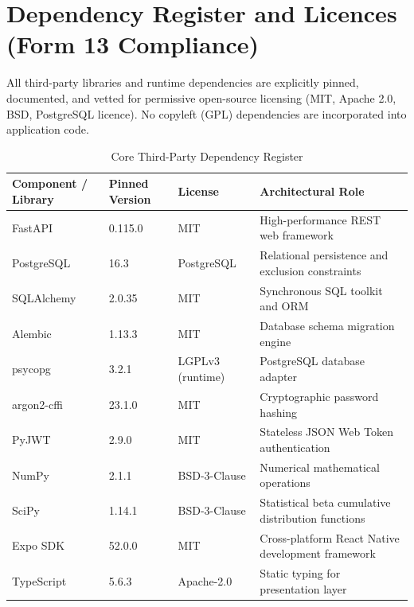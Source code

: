 \section{Dependency Register and Licences (Form 13 Compliance)}
All third-party libraries and runtime dependencies are explicitly pinned, documented, and vetted for permissive open-source licensing (MIT, Apache 2.0, BSD, PostgreSQL licence). No copyleft (GPL) dependencies are incorporated into application code.
\begin{table}[htbp]
\centering
\caption{Core Third-Party Dependency Register}
\label{tab:dependency_register}
\small
\begin{tabularx}{\textwidth}{l l l l}
\toprule
\textbf{Component / Library} & \textbf{Pinned Version} & \textbf{License} & \textbf{Architectural Role} \\
\midrule
FastAPI & 0.115.0 & MIT & High-performance REST web framework \\
PostgreSQL & 16.3 & PostgreSQL & Relational persistence and exclusion constraints \\
SQLAlchemy & 2.0.35 & MIT & Synchronous SQL toolkit and ORM \\
Alembic & 1.13.3 & MIT & Database schema migration engine \\
psycopg & 3.2.1 & LGPLv3 (runtime) & PostgreSQL database adapter \\
argon2-cffi & 23.1.0 & MIT & Cryptographic password hashing \\
PyJWT & 2.9.0 & MIT & Stateless JSON Web Token authentication \\
NumPy & 2.1.1 & BSD-3-Clause & Numerical mathematical operations \\
SciPy & 1.14.1 & BSD-3-Clause & Statistical beta cumulative distribution functions \\
Expo SDK & 52.0.0 & MIT & Cross-platform React Native development framework \\
TypeScript & 5.6.3 & Apache-2.0 & Static typing for presentation layer \\
\bottomrule
\end{tabularx}
\end{table}

